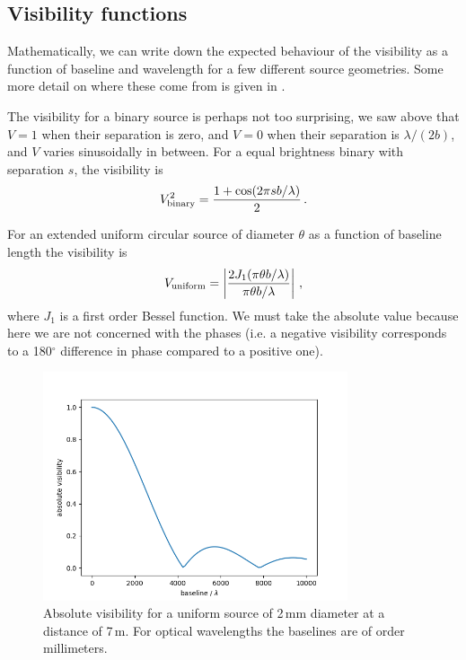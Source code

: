 \documentclass[11pt]{article}
\begin{document}
\subsection{Visibility functions}

Mathematically, we can write down the expected behaviour of the visibility as a function of baseline and wavelength for a few different source geometries. Some more detail on where these come from is given in \citet[][e.g. Fig 2.13]{2011psi..book.....G}.

The visibility for a binary source is perhaps not too surprising, we saw above that $V=1$ when their separation is zero, and $V=0$ when their separation is $\lambda/(2b)$, and $V$ varies sinusoidally in between. For a equal brightness binary with separation $s$, the visibility is
\begin{equation}
    V^2_{\rm binary} = \frac{1 + \cos ( 2 \pi s b / \lambda )}{2} \, .
\end{equation}

For an extended uniform circular source of diameter $\theta$ as a function of baseline length the visibility is
\begin{equation}
    V_{\rm uniform} =  \left\vert \frac{2 J_1(\pi \theta b / \lambda)}{\pi \theta b / \lambda} \right\vert \, ,
\end{equation}
where $J_1$ is a first order Bessel function. We must take the absolute value because here we are not concerned with the phases (i.e. a negative visibility corresponds to a 180$^\circ$ difference in phase compared to a positive one).

\begin{figure}
    \centering
    \includegraphics[width=0.8\textwidth]{doc/uniform_vis.png}
    \caption{Absolute visibility for a uniform source of 2\,mm diameter at a distance of 7\,m. For optical wavelengths the baselines are of order millimeters.}
    \label{fig:uniformvis}
\end{figure}
\end{document}
